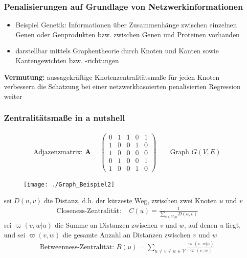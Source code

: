\documentclass{beamer}
\begin{document}
\begin{frame}
\frametitle{Penalisierungen auf Grundlage von Netzwerkinformationen}
	\begin{itemize}
	\item  Beispiel Genetik: Informationen über Zusammenhänge zwischen einzelnen Genen oder Genprodukten bzw. zwischen Genen und Proteinen vorhanden
	\item darstellbar mittels Graphentheorie durch Knoten und Kanten sowie Kantengewichten bzw. -richtungen
	\end{itemize}
	\textbf{Vermutung:} aussagekräftige Knotenzentralitätsmaße für jeden Knoten verbessern die Schätzung bei einer netzwerkbasoierten penalisierten Regression weiter
\end{frame}


\begin{frame}
	\frametitle{Zentralitätsmaße in a nutshell}
	\begin{align*}
	\text{Adjazenzmatrix: } \mathbf{A}=\begin{pmatrix}
	0 & 1 & 1 & 0 & 1 \\
	1 & 0 & 0 & 1 & 0 \\
	1 & 0 & 0 & 0 & 0 \\
	0 & 1 & 0 & 0 & 1 \\
	1 & 0 & 0 & 1 & 0
	\end{pmatrix} \qquad \text{Graph }G(V,E)
	\end{align*}
	\begin{figure}
	\centering
	\texttt{[image: ./Graph\_Beispiel2]}
	\label{fig:graphentheorie}
	\end{figure}
\end{frame}


\begin{frame}
	sei $D(u, v)$ die Distanz, d.h. der kürzeste Weg, zwischen zwei Knoten $u$ und $v$ 
	\begin{align*}
	\text{Closeness-Zentralität: } & C(u)=\frac{1}{\sum_{v \in V \setminus u} D(u, v)}
	\end{align*}
	sei $\varpi(v,w|u)$ die Summe an Distanzen zwischen $v$ und $w$, auf denen $u$ liegt, und sei $\varpi(v,w)$ die gesamte Anzahl an Distanzen zwischen $v$ und $w$
	\begin{align*}
		\text{Betweenness-Zentralität: } B(u)=\sum_{u \neq v \neq w \in V} \frac{\varpi(v,w|u)}{\varpi(v,w)}\\
	\end{align*}
\end{frame}
\end{document}
